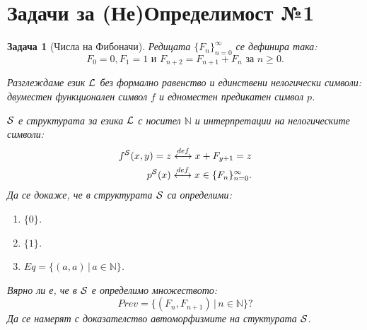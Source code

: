 \documentclass[12pt]{article}
\newtheorem{problem}{Задача}%
\begin{document}
\section*{Задачи за (Не)Определимост №1}

\begin{problem}[Числа на Фибоначи]
Редицата $\{F_n\}_{n=0}^{\infty}$ се дефинира така:
\begin{equation*}
F_0=0, F_1=1\text{ и } F_{n+2}=F_{n+1}+F_n \text{ за } n\ge 0.
\end{equation*}

Разглеждаме език ${\cal L}$ без формално равенство и единствени нелогически символи:
двуместен функционален символ $f$ и едноместен предикатен символ  $p$. 

${\cal S}$ е структурата за езика ${\cal L}$ с носител $\mathbb{N}$ и интерпретации на нелогическите символи:
\begin{eqnarray*}
f^{\cal S}(x,y) =z \overset{def}{\longleftrightarrow} x+F_{y+1}=z\\
p^{\cal S}(x) \overset{def}{\longleftrightarrow} x\in \{F_n\}_{n=0}^{\infty}.
\end{eqnarray*}
Да се докаже, че в структурата ${\cal S}$ са определими:
\begin{enumerate}
\item $\{0\}$.
\item $\{1\}$.
\item $Eq=\{(a,a)\,|\, a\in \mathbb{N}\}$.
\end{enumerate}
Вярно ли е, че в ${\cal S}$ е определимо множеството:
\begin{equation*}
Prev=\{(F_n,F_{n+1})\,|\, n\in \mathbb{N}\}?
\end{equation*}
Да се намерят с доказателство автоморфизмите на стуктурата ${\cal S}$.
\end{problem}
\end{document}
